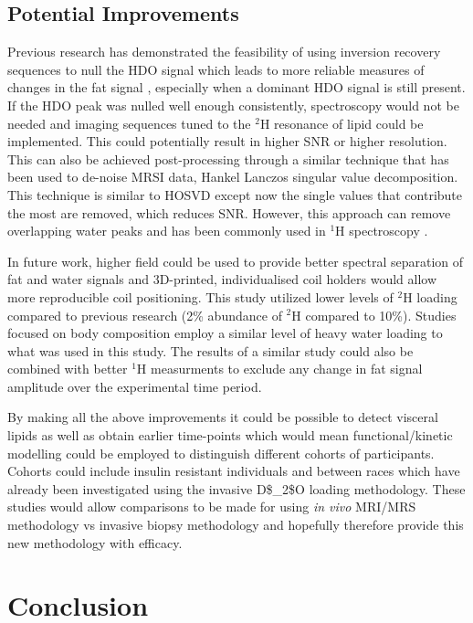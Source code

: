 \subsection{Potential Improvements}

Previous research has demonstrated the feasibility of using inversion recovery sequences to null the HDO signal which leads to more reliable measures of changes in the fat signal \cite{Brereton1989TheMice}, especially when a dominant \ac{HDO} signal is still present. If the \ac{HDO} peak was nulled well enough consistently, spectroscopy would not be needed and imaging sequences tuned to the $^2$H resonance of lipid could be implemented. This could potentially result in higher \ac{SNR} or higher resolution. This can also be achieved post-processing through a similar technique that has been used to de-noise \ac{MRSI} data, Hankel Lanczos singular value decomposition. This technique is similar to \ac{HOSVD} except now the single values that contribute the most are removed, which reduces SNR. However, this approach can remove overlapping water peaks and has been commonly used in $^1$H spectroscopy \cite{Jansen20061HMetabolites, Cabanes2001OptimizationBrain}.

In future work, higher field could be used to provide better spectral separation of fat and water signals and 3D-printed, individualised coil holders would allow more reproducible coil positioning. This study utilized lower levels of $^2$H loading compared to previous research (2\% abundance of $^2$H compared to 10\%). Studies focused on body composition employ a similar level of heavy water loading to what was used in this study. The results of a similar study could also be combined with better $^1$H measurments to exclude any change in fat signal amplitude over the experimental time period. 

By making all the above improvements it could be possible to detect visceral lipids as well as obtain earlier time-points which would mean functional/kinetic modelling could be employed to distinguish different cohorts of participants. Cohorts could include insulin resistant individuals \cite{White2017AssociationHumans} and between races \cite{White2018RacialHumans} which have already been investigated using the invasive \ac{D$_2$O} loading methodology. These studies would allow comparisons to be made for using \textit{in vivo} \ac{MRI}/\ac{MRS} methodology vs invasive biopsy methodology and hopefully therefore provide this new methodology with efficacy.

\section{Conclusion}

